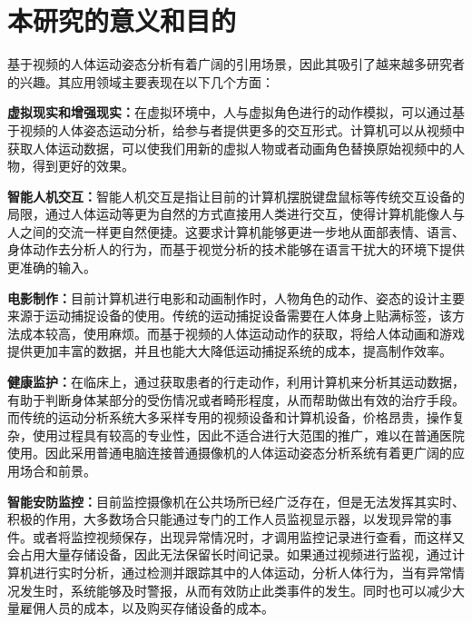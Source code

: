 \section{本研究的意义和目的}
基于视频的人体运动姿态分析有着广阔的引用场景，因此其吸引了越来越多研究者的兴趣。其应用领域主要表现在以下几个方面：

\textbf{虚拟现实和增强现实：}在虚拟环境中，人与虚拟角色进行的动作模拟，可以通过基于视频的人体姿态运动分析，给参与者提供更多的交互形式。计算机可以从视频中获取人体运动数据，可以使我们用新的虚拟人物或者动画角色替换原始视频中的人物，得到更好的效果。

\textbf{智能人机交互：}智能人机交互是指让目前的计算机摆脱键盘鼠标等传统交互设备的局限，通过人体运动等更为自然的方式直接用人类进行交互，使得计算机能像人与人之间的交流一样更自然便捷。这要求计算机能够更进一步地从面部表情、语言、身体动作去分析人的行为，而基于视觉分析的技术能够在语言干扰大的环境下提供更准确的输入。

\textbf{电影制作：}目前计算机进行电影和动画制作时，人物角色的动作、姿态的设计主要来源于运动捕捉设备的使用。传统的运动捕捉设备需要在人体身上贴满标签，该方法成本较高，使用麻烦。而基于视频的人体运动动作的获取，将给人体动画和游戏提供更加丰富的数据，并且也能大大降低运动捕捉系统的成本，提高制作效率。


\textbf{健康监护：}在临床上，通过获取患者的行走动作，利用计算机来分析其运动数据，有助于判断身体某部分的受伤情况或者畸形程度，从而帮助做出有效的治疗手段。而传统的运动分析系统大多采样专用的视频设备和计算机设备，价格昂贵，操作复杂，使用过程具有较高的专业性，因此不适合进行大范围的推广，难以在普通医院使用。因此采用普通电脑连接普通摄像机的人体运动姿态分析系统有着更广阔的应用场合和前景。

\textbf{智能安防监控：}目前监控摄像机在公共场所已经广泛存在，但是无法发挥其实时、积极的作用，大多数场合只能通过专门的工作人员监视显示器，以发现异常的事件。或者将监控视频保存，出现异常情况时，才调用监控记录进行查看，而这样又会占用大量存储设备，因此无法保留长时间记录。如果通过视频进行监视，通过计算机进行实时分析，通过检测并跟踪其中的人体运动，分析人体行为，当有异常情况发生时，系统能够及时警报，从而有效防止此类事件的发生。同时也可以减少大量雇佣人员的成本，以及购买存储设备的成本。

